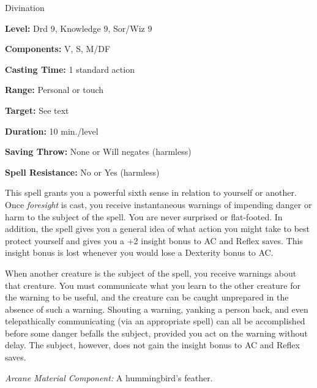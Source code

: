 
Divination

\textbf{Level:} Drd 9, Knowledge 9, Sor/Wiz 9

\textbf{Components:} V, S, M/DF

\textbf{Casting Time:} 1 standard action

\textbf{Range:} Personal or touch

\textbf{Target:} See text

\textbf{Duration:} 10 min./level

\textbf{Saving Throw:} None or Will negates (harmless)

\textbf{Spell Resistance:} No or Yes (harmless)

This spell grants you a powerful sixth sense in relation to yourself or another. 
Once \textit{foresight} is cast, you receive instantaneous warnings of impending 
danger or harm to the subject of the spell. You are never surprised or flat-footed. 
In addition, the spell gives you a general idea of what action you might take to 
best protect yourself and gives you a +2 insight bonus to AC and Reflex saves. 
This insight bonus is lost whenever you would lose a Dexterity bonus to AC.

When another creature is the subject of the spell, you receive warnings about that 
creature. You must communicate what you learn to the other creature for the warning 
to be useful, and the creature can be caught unprepared in the absence of such 
a warning. Shouting a warning, yanking a person back, and even telepathically communicating 
(via an appropriate spell) can all be accomplished before some danger befalls the 
subject, provided you act on the warning without delay. The subject, however, does 
not gain the insight bonus to AC and Reflex saves.

\textit{Arcane Material Component:} A hummingbird's feather.

